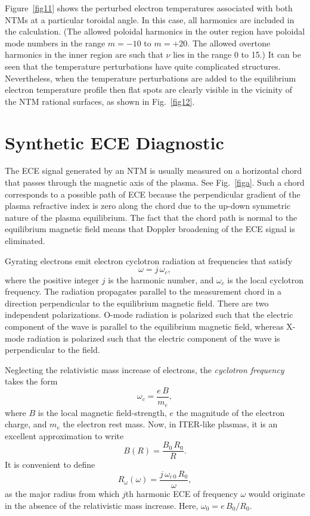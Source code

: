 \documentclass[12pt,prb,aps]{revtex4-1}
\begin{document}
Figure~\ref{fig11} shows
the perturbed electron temperatures associated with both NTMs at a particular toroidal angle. In this case, all harmonics are included in the calculation. (The allowed poloidal harmonics in the
outer region have poloidal mode numbers in the range $m=-10$ to $m=+20$. The allowed overtone harmonics in the inner region are such that
$\nu$ lies in the range $0$ to 15.) It can be seen that the temperature perturbations have quite complicated structures. Nevertheless, when the temperature perturbations are
added to the equilibrium electron temperature profile then flat spots are clearly visible in the vicinity of the NTM rational surfaces, as shown in Fig.~\ref{fig12}. 

\section{Synthetic ECE Diagnostic}\label{s6}
The ECE signal generated by an NTM is  usually measured on a horizontal chord that passes through the magnetic axis of the plasma. See Fig.~\ref{figa}.  Such a chord corresponds to a possible  path of ECE because 
the perpendicular gradient of the plasma refractive index is zero along the chord due to the up-down symmetric nature of the plasma equilibrium. The fact that the
chord path is normal to the equilibrium magnetic field means that Doppler
broadening of the ECE signal is eliminated.\cite{ece4a,ece5,bornatici} 

Gyrating electrons emit electron cyclotron radiation at frequencies that satisfy\,\cite{bornatici}
\begin{equation}
\omega= j\,\omega_c,
\end{equation}
where the positive integer $j$ is the harmonic number, and $\omega_c$ is the local cyclotron frequency. The radiation propagates parallel to the
measurement chord in a direction perpendicular to the equilibrium magnetic field. There are two independent polarizations. O-mode radiation is
polarized such that the electric component of the wave is parallel to the equilibrium magnetic field, whereas X-mode radiation is polarized such that the
electric component of the wave is perpendicular to the field.\cite{plasma}

Neglecting the relativistic mass increase of electrons, the {\em cyclotron frequency}\/ takes the form\,\cite{plasma}
\begin{equation}
\omega_c = \frac{e\,B}{m_e},
\end{equation}
where $B$ is the local magnetic field-strength, $e$ the magnitude of the electron charge, and $m_e$ the electron rest mass.
Now, in ITER-like plasmas, it is an excellent approximation to write
\begin{equation}
B(R)= \frac{B_0\,R_0}{R}.
\end{equation}
It is convenient to define
\begin{equation}\label{romega}
R_\omega(\omega) = \frac{j\,\omega_{c\,0}\,R_0}{\omega},
\end{equation}
as the major radius from which $j$th harmonic ECE of frequency $\omega$ would originate in the absence of the relativistic mass increase. Here, $\omega_0=e\,B_0/R_0$. 
\end{document}
